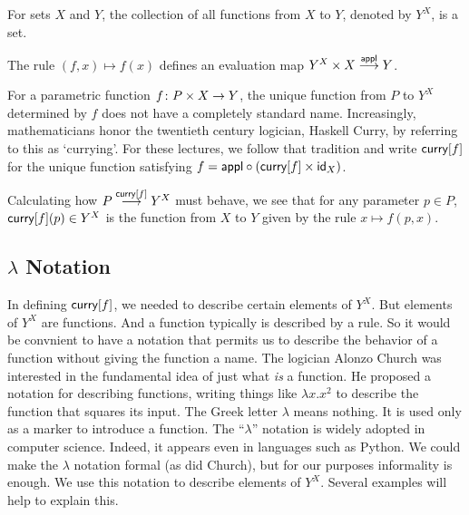 \begin{principle}
	For sets $X$ and $Y$, the collection of all functions from $X$ to $Y$, denoted by $Y^X$, is a set.
	
	The rule $(f,x) \mapsto f(x)$ defines an evaluation map $\sfromto \appl{Y^X\times X}Y$.
	
	For a parametric function $\fromto f{P\times X}Y$, the unique function from $P$ to $Y^X$ determined by $f$ does not have a completely standard name.
	Increasingly, mathematicians honor the twentieth century logician, Haskell Curry, by referring to this as `currying'.
	For these lectures, we follow that tradition and write $\curry[f]$ for the unique function satisfying $f = \appl\circ (\curry[f] \times \id_X)$.
	
	Calculating how $\sfromto {\curry[f]}P{Y^X}$ must behave, we see that for any parameter $p\in P$, $\curry[f](p)\in Y^X$ is the function from $X$ to $Y$ given by the rule $x\mapsto f(p,x)$.
\end{principle}

\subsection*{$\lambda$ Notation}

In defining $\curry[f]$, we needed to describe certain elements of $Y^X$.
But elements of $Y^X$ are functions. And a function typically is described by a rule.
So it would be convnient to have a notation that permits us to describe the behavior of a function without giving the function a name. 
The logician Alonzo Church was interested in the fundamental idea of just what \emph{is} a function. He proposed a notation for describing functions, writing things like $\lambda x.x^2$ to describe the function that squares its input. 
The Greek letter $\lambda$ means nothing.  It is used only as a marker to introduce a function. 
The ``$\lambda$'' notation is widely adopted in computer science. Indeed, it appears even in languages such as Python.  
We could make the $\lambda$ notation formal (as did Church), but for our purposes informality is enough. We use this notation to describe elements of $Y^X$. Several examples will help to explain this. 

